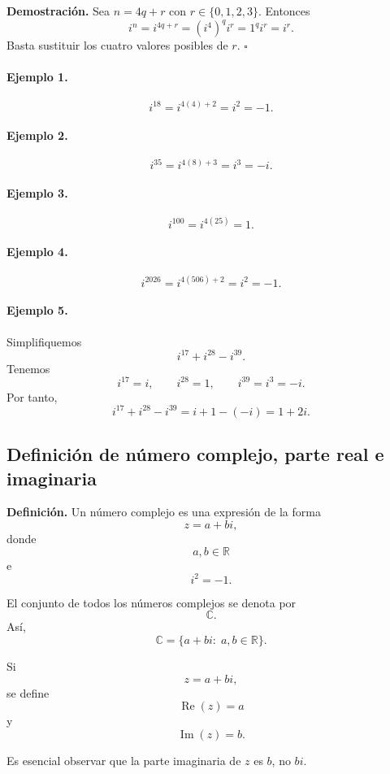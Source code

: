 \textbf{Demostración.}
Sea $n=4q+r$ con $r\in\{0,1,2,3\}$. Entonces
\[
i^n=i^{4q+r}=(i^4)^qi^r=1^qi^r=i^r.
\]
Basta sustituir los cuatro valores posibles de $r$.
\hfill$\square$

\paragraph{Ejemplo 1.}
\[
i^{18}=i^{4(4)+2}=i^2=-1.
\]

\paragraph{Ejemplo 2.}
\[
i^{35}=i^{4(8)+3}=i^3=-i.
\]

\paragraph{Ejemplo 3.}
\[
i^{100}=i^{4(25)}=1.
\]

\paragraph{Ejemplo 4.}
\[
i^{2026}=i^{4(506)+2}=i^2=-1.
\]

\paragraph{Ejemplo 5.}
Simplifiquemos
\[
i^{17}+i^{28}-i^{39}.
\]
Tenemos
\[
i^{17}=i,\qquad
i^{28}=1,\qquad
i^{39}=i^3=-i.
\]
Por tanto,
\[
i^{17}+i^{28}-i^{39}
=i+1-(-i)
=
\boxed{1+2i}.
\]

\subsection{Definición de número complejo, parte real e imaginaria}

\textbf{Definición.}
Un número complejo es una expresión de la forma
\[
\boxed{z=a+bi,}
\]
donde
\[
a,b\in\mathbb{R}
\]
e
\[
i^2=-1.
\]

El conjunto de todos los números complejos se denota por
\[
\boxed{\mathbb{C}}.
\]
Así,
\[
\boxed{
\mathbb{C}
=
\{a+bi:\;a,b\in\mathbb{R}\}.
}
\]

Si
\[
z=a+bi,
\]
se define
\[
\boxed{\operatorname{Re}(z)=a}
\]
y
\[
\boxed{\operatorname{Im}(z)=b.}
\]

Es esencial observar que la parte imaginaria de $z$ es $b$, no $bi$.

